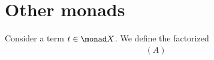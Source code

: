 \section{Other monads}


Consider a term $t \in \monad X$. We define the factorized 
\begin{align*}
(A)
\end{align*}